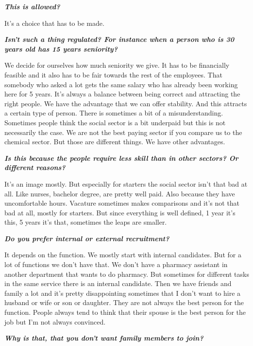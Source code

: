 \documentclass[a4paper,fleqn,11pt,dvips,titlepage]{article}
\newcommand{\question}[1]{\textbf{\textit{#1}}}
\numberwithin{figure}{section}
\numberwithin{equation}{section}
\begin{document}
\question{This is allowed?}

It’s a choice that has to be made. 

\question{Isn’t such a thing regulated? For instance when a person who is 30 years old has 15 years seniority?}

We decide for ourselves how much seniority we give. It has to be financially feasible and it also has to be fair towards the rest of the employees. That somebody who asked a lot gets the same salary who has already been working here for 5 years. It’s always a balance between being correct and attracting the right people. We have the advantage that we can offer stability. And this attracts a certain type of person. There is sometimes a bit of a misunderstanding. Sometimes people think the social sector is a bit underpaid but this is not necessarily the case. We are not the best paying sector if you compare us to the chemical sector. But those are different things. We have other advantages. 

\question{Is this because the people require less skill than in other sectors? Or different reasons?}

It’s an image mostly. But especially for starters the social sector isn’t that bad at all. Like nurses, bachelor degree, are pretty well paid. Also because they have uncomfortable hours. Vacature sometimes makes comparisons and it’s not that bad at all, mostly for starters. But since everything is well defined, 1 year it’s this, 5 years it’s that, sometimes the leaps are smaller. 

\question{Do you prefer internal or external recruitment?}

It depends on the function. We mostly start with internal candidates. But for a lot of functions we don’t have that. We don’t have a pharmacy assistant in another department that wants to do pharmacy. But sometimes for different tasks in the same service there is an internal candidate. Then we have friends and family a lot and it’s pretty disappointing sometimes that I don’t want to hire a husband or wife or son or daughter. They are not always the best person for the function. People always tend to think that their spouse is the best person for the job but I’m not always convinced. 

\question{Why is that, that you don’t want family members to join?}
\end{document}
